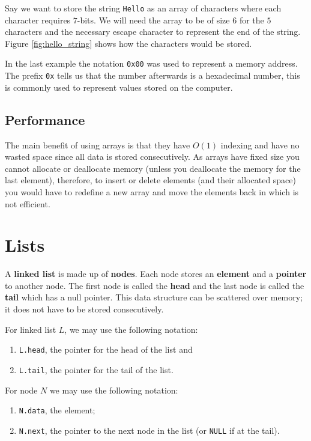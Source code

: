 \begin{example}
    Say we want to store the string \texttt{Hello} as an array of characters where each character requires $7$-bits. We will need the array to be of size $6$ for the $5$ characters and the necessary escape character to represent the end of the string. Figure \ref{fig:hello_string} shows how the characters would be stored.
\end{example}

\begin{remark}
    In the last example the notation \texttt{0x00} was used to represent a memory address. The prefix \texttt{0x} tells us that the number afterwards is a hexadecimal number, this is commonly used to represent values stored on the computer.
\end{remark}

\subsection{Performance}

The main benefit of using arrays is that they have $O(1)$ indexing and have no wasted space since all data is stored consecutively. As arrays have fixed size you cannot allocate or deallocate memory (unless you deallocate the memory for the last element), therefore, to insert or delete elements (and their allocated space) you would have to redefine a new array and move the elements back in which is not efficient.

\section{Lists}

\begin{definition}
    A \textbf{linked list} is made up of \textbf{nodes}. Each node stores an \textbf{element} and a \textbf{pointer} to another node. The first node is called the \textbf{head} and the last node is called the \textbf{tail} which has a null pointer. This data structure can be scattered over memory; it does not have to be stored consecutively.
    
    For linked list $L$, we may use the following notation:
    \begin{enumerate}[label=(\roman*)]
        \item \texttt{L.head}, the pointer for the head of the list and
        \item \texttt{L.tail}, the pointer for the tail of the list.
    \end{enumerate}
    For node $N$ we may use the following notation:
    \begin{enumerate}[label=(\roman*)]
        \item \texttt{N.data}, the element;
        \item \texttt{N.next}, the pointer to the next node in the list (or \texttt{NULL} if at the tail).
    \end{enumerate}
\end{definition}

